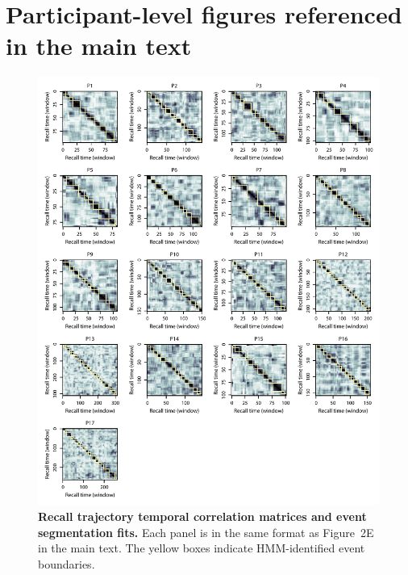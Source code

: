 \documentclass{article}
\begin{document}
\FloatBarrier
\section*{Participant-level figures referenced in the main text}

\begin{figure}[p!]
\centering
\includegraphics[width=\textwidth]{figs/corrmats}
\caption{\small \textbf{Recall trajectory temporal correlation matrices and event segmentation fits.} Each panel is in the same format as Figure~2E in the main text.  The yellow boxes indicate HMM-identified event boundaries.}
\label{fig:corrmats}
\end{figure}
\end{document}
